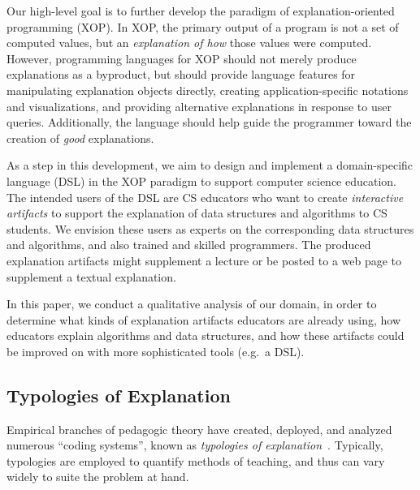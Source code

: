 \documentclass[conference]{IEEEtran}
\begin{document}
Our high-level goal is to further develop the paradigm of explanation-oriented
programming (XOP). In XOP, the primary output of a program is not a set of
computed values, but an \emph{explanation of how} those values were computed.
However, programming languages for XOP should not merely produce explanations
as a byproduct, but should provide language features for manipulating
explanation objects directly, creating application-specific notations and
visualizations, and providing alternative explanations in response to user
queries. Additionally, the language should help guide the programmer toward the
creation of \emph{good} explanations.

As a step in this development, we aim to design and implement a domain-specific
language (DSL) in the XOP paradigm to support computer science education. The
intended users of the DSL are CS educators who want to create \emph{interactive
artifacts} to support the explanation of data structures and algorithms to CS
students. We envision these users as experts on the corresponding data
structures and algorithms, and also trained and skilled programmers. The
produced explanation artifacts might supplement a lecture or be posted to a web
page to supplement a textual explanation.

In this paper, we conduct a qualitative analysis of our domain, in order to
determine what kinds of explanation artifacts educators are already using, how
educators explain algorithms and data structures, and how these artifacts could
be improved on with more sophisticated tools (e.g.\ a DSL).

\subsection{Typologies of Explanation}

Empirical branches of pedagogic theory have created, deployed, and analyzed
numerous ``coding systems'', known as \emph{typologies of
  explanation}~\cite{westbury1971research, nla.cat-vn407830,
  rosenshine1968objectively, hyman1968teaching, ennis1969logic,
  smith1967language, bellack1966language}. Typically, typologies are employed to
quantify methods of teaching, and thus can vary widely to suite the problem at
hand.
\end{document}
